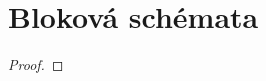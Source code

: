 \section{\texorpdfstring{Bloková schémata}{Bloková schémata}}
\vspace{5mm}
\large

\begin{definition}
\end{definition}

\begin{definition}
\end{definition}

\begin{theorem}

\end{theorem}
\begin{proof}
\end{proof}
